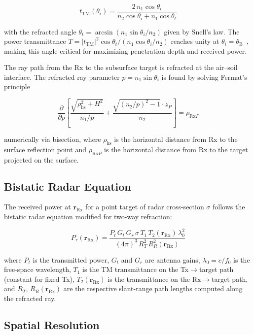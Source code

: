 \documentclass[journal]{IEEEtran}
\newcommand{\Rx}{\mathrm{Rx}}
\newcommand{\rRx}{\mathbf{r}_{\Rx}}
\newcommand{\thetaB}{\theta_{\mathrm{B}}}
\begin{document}
\begin{equation}
  t_{\mathrm{TM}}(\theta_i) =
    \frac{2\,n_1\cos\theta_i}
         {n_2\cos\theta_i + n_1\cos\theta_t}
  \label{eq:tTM}
\end{equation}

with the refracted angle $\theta_t = \arcsin(n_1\sin\theta_i/n_2)$ given by
Snell's law. The power transmittance $T = |t_{\mathrm{TM}}|^2 \cos\theta_t /
(n_1 \cos\theta_i / n_2)$ reaches unity at $\theta_i = \thetaB$~\cite{born1999},
making this angle critical for maximizing penetration depth and received power.

The ray path from the Rx to the subsurface target is refracted at the
air--soil interface. The refracted ray parameter $p = n_1\sin\theta_i$ is
found by solving Fermat's principle

\begin{equation}
  \frac{\partial}{\partial p}\!\left[
    \frac{\sqrt{\rho_{\mathrm{hs}}^2 + H^2}}{\,n_1/p\,}
    + \frac{\sqrt{(n_2/p)^2 - 1}\cdot z_P}{n_2}
  \right] = \rho_{\Rx P}
  \label{eq:fermat}
\end{equation}

numerically via bisection, where $\rho_{\mathrm{hs}}$ is the horizontal
distance from Rx to the surface reflection point and $\rho_{\Rx P}$ is the
horizontal distance from Rx to the target projected on the surface.

\subsection{Bistatic Radar Equation}

The received power at $\rRx$ for a point target of radar cross-section
$\sigma$ follows the bistatic radar equation modified for two-way refraction:

\begin{equation}
  P_r(\rRx) = \frac{P_t\,G_t\,G_r\,\sigma\,T_1\,T_2(\rRx)\,\lambda_0^2}
                   {(4\pi)^3\,R_T^2\,R_R^2(\rRx)}
  \label{eq:Pr}
\end{equation}

where $P_t$ is the transmitted power, $G_t$ and $G_r$ are antenna gains,
$\lambda_0 = c/f_0$ is the free-space wavelength, $T_1$ is the TM
transmittance on the Tx$\to$target path (constant for fixed Tx), $T_2(\rRx)$
is the transmittance on the Rx$\to$target path, and $R_T$, $R_R(\rRx)$ are
the respective slant-range path lengths computed along the refracted ray.

\subsection{Spatial Resolution}
\end{document}
